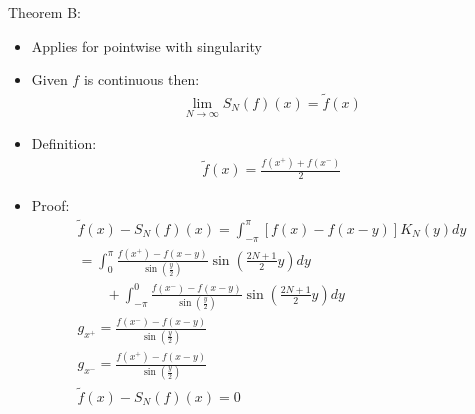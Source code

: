 \documentclass[12pt, a4paper]{article}
\begin{document}
Theorem B:
\begin{itemize}
    \item Applies for pointwise with singularity
    \item Given $f$ is continuous then:
    \begin{gather*}
        \lim_{N\to\infty} S_N(f)(x) = \tilde{f}(x)
    \end{gather*}
    \item Definition:
    \begin{gather*}
        \tilde{f}(x)  = \frac{f(x^+)+f(x^-)}{2}
    \end{gather*}
    \item Proof:
    \begin{gather*}
        \tilde{f}(x)-S_N(f)(x)=\int_{-\pi}^\pi [f(x) - f(x-y)]K_N(y)dy\\
        = \int_{0}^\pi \frac{f(x^+) - f(x-y)}{\sin{\left(\frac{y}{2}\right)}}\sin{\left(\frac{2N+1}{2}y\right)}dy \\ \qquad + \int_{-\pi}^0 \frac{f(x^-) - f(x-y)}{\sin{\left(\frac{y}{2}\right)}}\sin{\left(\frac{2N+1}{2}y\right)}dy\\
        g_{x^+} = \frac{f(x^-) - f(x-y)}{\sin{\left(\frac{y}{2}\right)}}\\
        g_{x^-} = \frac{f(x^+) - f(x-y)}{\sin{\left(\frac{y}{2}\right)}}\\
        \tilde{f}(x)-S_N(f)(x) = 0
    \end{gather*}
\end{itemize}
\vspace{0.3em}
\end{document}

